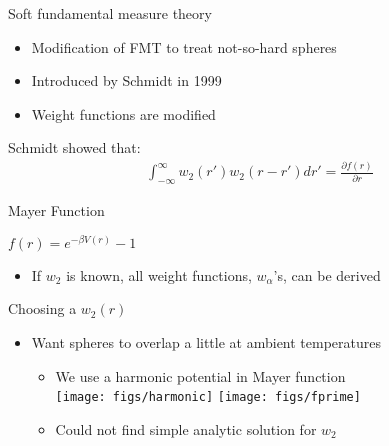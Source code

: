 \documentclass{beamer}
\begin{document}
\begin{frame}{Soft fundamental measure theory}
  \begin{itemize}
    \item Modification of FMT to treat not-so-hard spheres
    \item Introduced by Schmidt in 1999
    \item Weight functions are modified
  \end{itemize}
  Schmidt showed that:
  \begin{align}
    \int_{-\infty}^{\infty}w_2(r')w_2(r - r') dr' = \frac{\partial f(r)}{\partial r}
  \end{align}
  \begin{block}{Mayer Function}
    \begin{center}
      $f(r) = e^{-\beta V(r)} - 1$ \\
    \end{center}
\end{block}
  \begin{itemize}
    \item If $w_2$ is known, all weight functions, $w_{\alpha}$'s, can
      be derived
  \end{itemize}
\end{frame}

\begin{frame}{Choosing a $w_2(r)$}
  \begin{itemize}
    \item Want spheres to overlap a little at ambient temperatures
    \begin{itemize}
      \item We use a harmonic potential in Mayer function\\
      \texttt{[image: figs/harmonic]}
      \texttt{[image: figs/fprime]}
      \item Could not find simple analytic solution for $w_2$
    \end{itemize}
  \end{itemize}
\end{frame}
\end{document}
